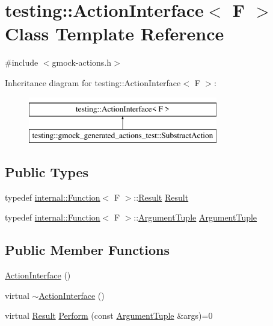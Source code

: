 \hypertarget{classtesting_1_1ActionInterface}{}\section{testing\+::Action\+Interface$<$ F $>$ Class Template Reference}
\label{classtesting_1_1ActionInterface}


{\ttfamily \#include $<$gmock-\/actions.\+h$>$}

Inheritance diagram for testing\+::Action\+Interface$<$ F $>$\+:\begin{figure}[H]
\begin{center}
\leavevmode
\includegraphics[height=2.000000cm]{classtesting_1_1ActionInterface}
\end{center}
\end{figure}
\subsection*{Public Types}
\begin{DoxyCompactItemize}
\item 
typedef \mbox{\hyperlink{structtesting_1_1internal_1_1Function}{internal\+::\+Function}}$<$ F $>$\+::\mbox{\hyperlink{classtesting_1_1ActionInterface_a7477de2fe3e4e01c59db698203acaee7}{Result}} \mbox{\hyperlink{classtesting_1_1ActionInterface_a7477de2fe3e4e01c59db698203acaee7}{Result}}
\item 
typedef \mbox{\hyperlink{structtesting_1_1internal_1_1Function}{internal\+::\+Function}}$<$ F $>$\+::\mbox{\hyperlink{classtesting_1_1ActionInterface_af72720d864da4d606629e83edc003511}{Argument\+Tuple}} \mbox{\hyperlink{classtesting_1_1ActionInterface_af72720d864da4d606629e83edc003511}{Argument\+Tuple}}
\end{DoxyCompactItemize}
\subsection*{Public Member Functions}
\begin{DoxyCompactItemize}
\item 
\mbox{\hyperlink{classtesting_1_1ActionInterface_a0f1d44e4c669a9cae5ee5b28419a6f52}{Action\+Interface}} ()
\item 
virtual \mbox{\hyperlink{classtesting_1_1ActionInterface_a7dd0a5fc93d86ae3c9d04963b9f3a93f}{$\sim$\+Action\+Interface}} ()
\item 
virtual \mbox{\hyperlink{classtesting_1_1ActionInterface_a7477de2fe3e4e01c59db698203acaee7}{Result}} \mbox{\hyperlink{classtesting_1_1ActionInterface_a20f8624fcea1786f2992b358760422a0}{Perform}} (const \mbox{\hyperlink{classtesting_1_1ActionInterface_af72720d864da4d606629e83edc003511}{Argument\+Tuple}} \&args)=0
\end{DoxyCompactItemize}


